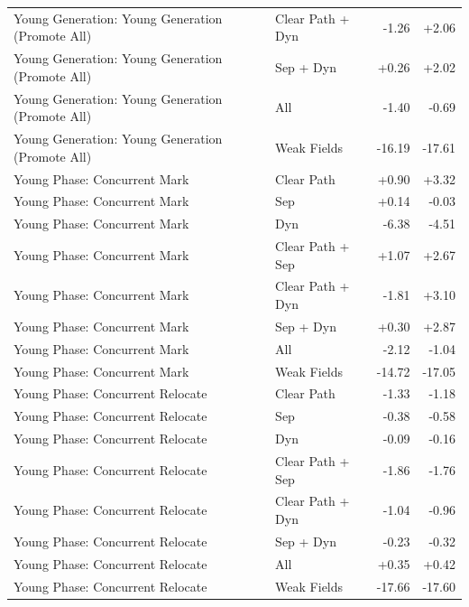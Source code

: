 \begin{table}[t]
\begin{tabular}{llrr}
Young Generation: Young Generation (Promote All) & Clear Path + Dyn & -1.26 & +2.06 \\
Young Generation: Young Generation (Promote All) & Sep + Dyn & +0.26 & +2.02 \\
Young Generation: Young Generation (Promote All) & All & -1.40 & -0.69 \\
Young Generation: Young Generation (Promote All) & Weak Fields & -16.19 & -17.61 \\
Young Phase: Concurrent Mark & Clear Path & +0.90 & +3.32 \\
Young Phase: Concurrent Mark & Sep & +0.14 & -0.03 \\
Young Phase: Concurrent Mark & Dyn & -6.38 & -4.51 \\
Young Phase: Concurrent Mark & Clear Path + Sep & +1.07 & +2.67 \\
Young Phase: Concurrent Mark & Clear Path + Dyn & -1.81 & +3.10 \\
Young Phase: Concurrent Mark & Sep + Dyn & +0.30 & +2.87 \\
Young Phase: Concurrent Mark & All & -2.12 & -1.04 \\
Young Phase: Concurrent Mark & Weak Fields & -14.72 & -17.05 \\
Young Phase: Concurrent Relocate & Clear Path & -1.33 & -1.18 \\
Young Phase: Concurrent Relocate & Sep & -0.38 & -0.58 \\
Young Phase: Concurrent Relocate & Dyn & -0.09 & -0.16 \\
Young Phase: Concurrent Relocate & Clear Path + Sep & -1.86 & -1.76 \\
Young Phase: Concurrent Relocate & Clear Path + Dyn & -1.04 & -0.96 \\
Young Phase: Concurrent Relocate & Sep + Dyn & -0.23 & -0.32 \\
Young Phase: Concurrent Relocate & All & +0.35 & +0.42 \\
Young Phase: Concurrent Relocate & Weak Fields & -17.66 & -17.60 \\
\bottomrule
\end{tabular}
\end{table}
